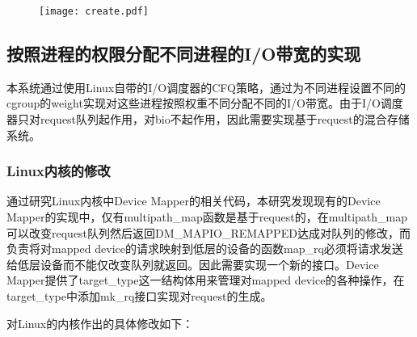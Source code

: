 \begin{figure}[!htp]
    \centering
    \texttt{[image: create.pdf]}
\end{figure}

\subsection{按照进程的权限分配不同进程的I/O带宽的实现}

本系统通过使用Linux自带的I/O调度器的CFQ策略，通过为不同进程设置不同的cgroup的weight实现对这些进程按照权重不同分配不同的I/O带宽。由于I/O调度器只对request队列起作用，对bio不起作用，因此需要实现基于request的混合存储系统。

\subsubsection{Linux内核的修改}

通过研究Linux内核中Device Mapper的相关代码，本研究发现现有的Device Mapper的实现中，仅有multipath\_map函数是基于request的，在multipath\_map可以改变request队列然后返回DM\_MAPIO\_REMAPPED达成对队列的修改，而负责将对mapped device的请求映射到低层的设备的函数map\_rq必须将请求发送给低层设备而不能仅改变队列就返回。因此需要实现一个新的接口。Device Mapper提供了target\_type这一结构体用来管理对mapped device的各种操作，在target\_type中添加mk\_rq接口实现对request的生成。

对Linux的内核作出的具体修改如下：

